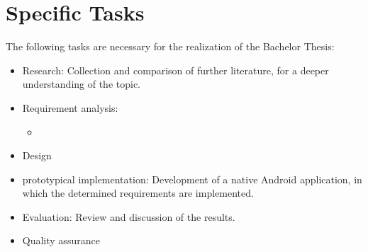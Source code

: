\section{Specific Tasks}
\label{sec:specific-tasks}

The following tasks are necessary for the realization of the Bachelor Thesis:
%
\begin{itemize}
    \item Research: Collection and comparison of further literature, for a deeper understanding of the topic.
    \item Requirement analysis: 
        \begin{itemize}
        	\item
        \end{itemize}
    \item Design
    \item prototypical implementation: Development of a native Android application, in which the determined requirements are implemented.
    \item Evaluation: Review and discussion of the results.
    \item Quality assurance
\end{itemize}